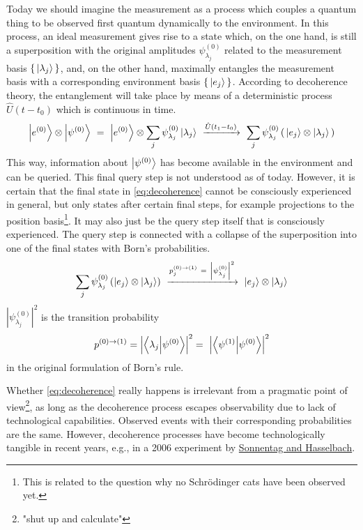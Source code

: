 \documentclass[12pt]{article}
\begin{document}
Today we should imagine the measurement as a process which couples a quantum thing to be observed first quantum dynamically to the environment. 
In this process, an ideal measurement gives rise to a state which, on the one hand, is still a superposition with the original amplitudes $\psi^{(0)}_{\lambda_j}$ related to the measurement basis $\{\,\ket{\lambda_j}\,\}$, and, on the other hand, maximally entangles the measurement basis with a corresponding environment basis $\{\,\ket{e_j}\,\}$. According to decoherence theory, the entanglement will take place by means of a deterministic process $\hat{U}(t-t_0)$ which is continuous in time.
\begin{equation}
\label{eq:decoherence}
\ket{e^{(0)}}\otimes\ket{\psi^{(0)}}\ =\ \ket{e^{(0)}}\otimes\sum_j \psi^{(0)}_{\lambda_j} \ket{\lambda_j}
\ \xrightarrow{\hat{U}(t_1-t_0)}\ \sum_j \psi^{(0)}_{\lambda_j} \left(\, \ket{e_j} \otimes \ket{\lambda_j}\, \right)
\end{equation}
This way, information about $\ket{\psi^{(0)}}$ has become available in the environment and can be queried. This final query step is not understood as of today. However, it is certain that the final state in \eqref{eq:decoherence} cannot be consciously experienced in general, but only states after certain final steps, for example projections to the position basis\footnote{This is related to the question why no Schrödinger cats have been observed yet.}. It may also just be the query step itself that is consciously experienced. The query step is connected with a collapse of the superposition into one of the final states with Born's probabilities.
\begin{equation} 
\label{eq:collapse}
\sum_j \psi^{(0)}_{\lambda_j} \left( \ket{e_j} \otimes \ket{\lambda_j} \right)
\ \xrightarrow{p_j^{(0)\rightarrow(1)}\ =\ \left|\psi^{(0)}_{\lambda_j}\right|^2}\ 
\ket{e_j} \otimes \ket{\lambda_j}
\end{equation}
$\left|\psi^{(0)}_{\lambda_j}\right|^2$ is the transition probability 
\begin{equation} 
\label{eq:orig_Born}
p^{(0)\rightarrow(1)} 
= \Bigl| \bra{\lambda_j}\ket{\psi^{(0)}} \Bigr| ^2
=\ \Bigl| \bra{\psi^{(1)}}\ket{\psi^{(0)}} \Bigr| ^2
\end{equation}
in the original formulation of Born's rule.

Whether \eqref{eq:decoherence} really happens is irrelevant from a pragmatic point of view\footnote{"shut up and calculate"}, as long as the decoherence process escapes observability due to lack of technological capabilities. Observed events with their corresponding probabilities are the same. However, decoherence processes have become technologically tangible in recent years, e.g., in a 2006 experiment by \href{https://journals.aps.org/prl/abstract/10.1103/PhysRevLett.98.200402}{Sonnentag and Hasselbach}.
\end{document}
